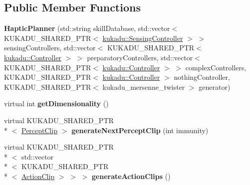 \subsection*{Public Member Functions}
\begin{DoxyCompactItemize}
\item 
\hypertarget{classkukadu_1_1HapticPlanner_a7b2694b3c164abd63094612a7f8b020a}{{\bfseries Haptic\-Planner} (std\-::string skill\-Database, std\-::vector$<$ K\-U\-K\-A\-D\-U\-\_\-\-S\-H\-A\-R\-E\-D\-\_\-\-P\-T\-R$<$ \hyperlink{classkukadu_1_1SensingController}{kukadu\-::\-Sensing\-Controller} $>$ $>$ sensing\-Controllers, std\-::vector$<$ K\-U\-K\-A\-D\-U\-\_\-\-S\-H\-A\-R\-E\-D\-\_\-\-P\-T\-R$<$ \hyperlink{classkukadu_1_1Controller}{kukadu\-::\-Controller} $>$ $>$ preparatory\-Controllers, std\-::vector$<$ K\-U\-K\-A\-D\-U\-\_\-\-S\-H\-A\-R\-E\-D\-\_\-\-P\-T\-R$<$ \hyperlink{classkukadu_1_1Controller}{kukadu\-::\-Controller} $>$ $>$ complex\-Controllers, K\-U\-K\-A\-D\-U\-\_\-\-S\-H\-A\-R\-E\-D\-\_\-\-P\-T\-R$<$ \hyperlink{classkukadu_1_1Controller}{kukadu\-::\-Controller} $>$ nothing\-Controller, K\-U\-K\-A\-D\-U\-\_\-\-S\-H\-A\-R\-E\-D\-\_\-\-P\-T\-R$<$ kukadu\-\_\-mersenne\-\_\-twister $>$ generator)}\label{classkukadu_1_1HapticPlanner_a7b2694b3c164abd63094612a7f8b020a}

\item 
\hypertarget{classkukadu_1_1HapticPlanner_a8e5fe565402949ff974a32bd1a895883}{virtual int {\bfseries get\-Dimensionality} ()}\label{classkukadu_1_1HapticPlanner_a8e5fe565402949ff974a32bd1a895883}

\item 
\hypertarget{classkukadu_1_1HapticPlanner_a588f0364647cff1401ce4eae9d819f47}{virtual K\-U\-K\-A\-D\-U\-\_\-\-S\-H\-A\-R\-E\-D\-\_\-\-P\-T\-R\\*
$<$ \hyperlink{classkukadu_1_1PerceptClip}{Percept\-Clip} $>$ {\bfseries generate\-Next\-Percept\-Clip} (int immunity)}\label{classkukadu_1_1HapticPlanner_a588f0364647cff1401ce4eae9d819f47}

\item 
\hypertarget{classkukadu_1_1HapticPlanner_aa386d3e94482e5181626c1eddebffd7b}{virtual K\-U\-K\-A\-D\-U\-\_\-\-S\-H\-A\-R\-E\-D\-\_\-\-P\-T\-R\\*
$<$ std\-::vector\\*
$<$ K\-U\-K\-A\-D\-U\-\_\-\-S\-H\-A\-R\-E\-D\-\_\-\-P\-T\-R\\*
$<$ \hyperlink{classkukadu_1_1ActionClip}{Action\-Clip} $>$ $>$ $>$ {\bfseries generate\-Action\-Clips} ()}\label{classkukadu_1_1HapticPlanner_aa386d3e94482e5181626c1eddebffd7b}


\end{DoxyCompactItemize}
